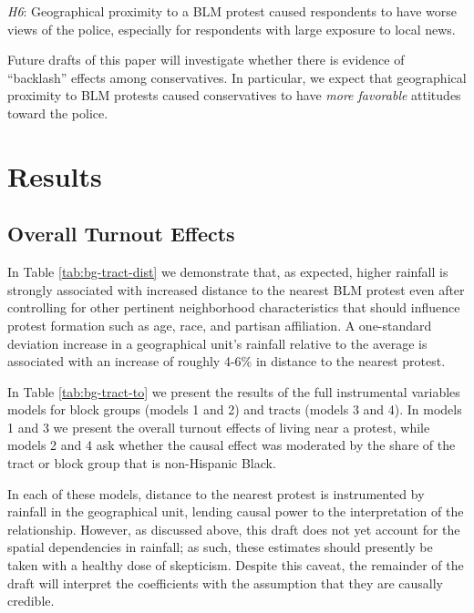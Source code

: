 \documentclass[
  12pt,
]{article}
\begin{document}
\emph{H6}: Geographical proximity to a BLM protest caused respondents to have worse views of the police, especially for respondents with large exposure to local news.

Future drafts of this paper will investigate whether there is evidence of ``backlash'' effects among conservatives. In particular, we expect that geographical proximity to BLM protests caused conservatives to have \emph{more favorable} attitudes toward the police.

\hypertarget{results}{%
\section*{Results}\label{results}}

\hypertarget{overall-turnout-effects}{%
\subsection*{Overall Turnout Effects}\label{overall-turnout-effects}}

In Table \ref{tab:bg-tract-dist} we demonstrate that, as expected, higher rainfall is strongly associated with increased distance to the nearest BLM protest even after controlling for other pertinent neighborhood characteristics that should influence protest formation such as age, race, and partisan affiliation. A one-standard deviation increase in a geographical unit's rainfall relative to the average is associated with an increase of roughly 4-6\% in distance to the nearest protest.

\begin{singlespace}

\end{singlespace}

In Table \ref{tab:bg-tract-to} we present the results of the full instrumental variables models for block groups (models 1 and 2) and tracts (models 3 and 4). In models 1 and 3 we present the overall turnout effects of living near a protest, while models 2 and 4 ask whether the causal effect was moderated by the share of the tract or block group that is non-Hispanic Black.

In each of these models, distance to the nearest protest is instrumented by rainfall in the geographical unit, lending causal power to the interpretation of the relationship. However, as discussed above, this draft does not yet account for the spatial dependencies in rainfall; as such, these estimates should presently be taken with a healthy dose of skepticism. Despite this caveat, the remainder of the draft will interpret the coefficients with the assumption that they are causally credible.
\end{document}
